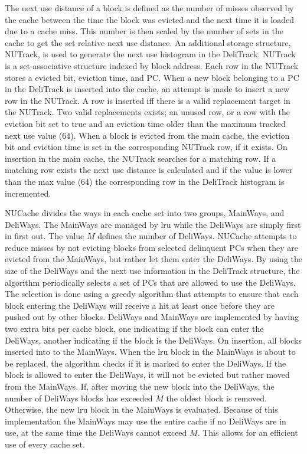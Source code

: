 The next use distance of a block is defined as the number of misses observed by the cache between the time the block was evicted and the next time it is loaded due to a cache miss.
This number is then scaled by the number of sets in the cache to get the set relative next use distance.
An additional storage structure, NUTrack, is used to generate the next use histogram in the DeliTrack.
NUTrack is a set-associative structure indexed by block address.
Each row in the NUTrack stores a evicted bit, eviction time, and PC.
When a new block belonging to a PC in the DeliTrack is inserted into the cache, an attempt is made to insert a new row in the NUTrack. 
A row is inserted iff there is a valid replacement target in the NUTrack.
Two valid replacements exists; an unused row, or a row with the eviction bit set to true and an eviction time older than the maximum tracked next use value (64).
When a block is evicted from the main cache, the eviction bit and eviction time is set in the corresponding NUTrack row, if it exists.
On insertion in the main cache, the NUTrack searches for a matching row. 
If a matching row exists the next use distance is calculated and if the value is lower than the max value (64) the corresponding row in the DeliTrack histogram is incremented.

NUCache divides the ways in each cache set into two groups, MainWays, and DeliWays.
The MainWays are managed by \gls{lru} while the DeliWays are simply first in first out.
The value $M$ defines the number of DeliWays.
NUCache attempts to reduce misses by not evicting blocks from selected delinquent PCs when they are evicted from the MainWays, but rather let them enter the DeliWays.
By using the size of the DeliWays and the next use information in the DeliTrack structure, the algorithm periodically selects a set of PCs that are allowed to use the DeliWays.
The selection is done using a greedy algorithm that attempts to ensure that each block entering the DeliWays will receive a hit at least once before they are pushed out by other blocks.
DeliWays and MainWays are implemented by having two extra bits per cache block, one indicating if the block can enter the DeliWays, another indicating if the block is the DeliWays.
On insertion, all blocks inserted into to the MainWays.
When the \gls{lru} block in the MainWays is about to be replaced, the algorithm checks if it is marked to enter the DeliWays.
If the block is allowed to enter the DeliWays, it will not be evicted but rather moved from the MainWays.
If, after moving the new block into the DeliWays, the number of DeliWays blocks has exceeded $M$ the oldest block is removed.
Otherwise, the new \gls{lru} block in the MainWays is evaluated.
Because of this implementation the MainWays may use the entire cache if no DeliWays are in use, at the same time the DeliWays cannot exceed $M$.
This allows for an efficient use of every cache set.

